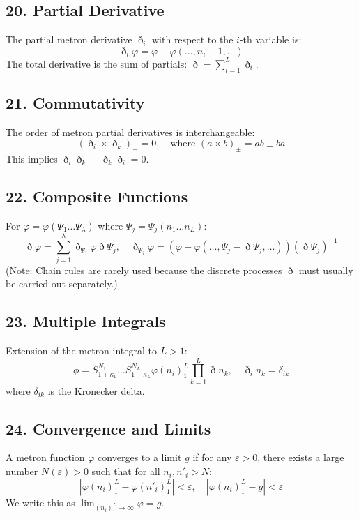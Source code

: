 \documentclass[11pt,a4paper,oneside]{article}
\begin{document}
\subsection{20. Partial Derivative}
The partial metron derivative $\eth_i$ with respect to the $i$-th variable is:
\[
    \eth_i \varphi = \varphi - \varphi(\dots, n_i-1, \dots)
\]
The total derivative is the sum of partials: $\eth = \sum_{i=1}^L \eth_i$.

\subsection{21. Commutativity}
The order of metron partial derivatives is interchangeable:
\begin{equation*}
    (\eth_i \times \eth_k)_- = 0, \quad \text{where } (a \times b)_\pm = ab \pm ba
\end{equation*}
This implies $\eth_i \eth_k - \eth_k \eth_i = 0$.

\subsection{22. Composite Functions}
For $\varphi = \varphi(\Psi_1 \dots \Psi_\lambda)$ where $\Psi_j = \Psi_j(n_1 \dots n_L)$:
\begin{equation}
    \eth \varphi = \sum_{j=1}^{\lambda} \eth_{\Psi_j} \varphi \eth \Psi_j, \quad \eth_{\Psi_j} \varphi = (\varphi - \varphi(\dots, \Psi_j - \eth \Psi_j, \dots))(\eth \Psi_j)^{-1} \tag{M9a}
\end{equation}
(Note: Chain rules are rarely used because the discrete processes $\eth$ must usually be carried out separately.)

\subsection{23. Multiple Integrals}
Extension of the metron integral to $L > 1$:
\begin{equation}
    \phi = S_{1+\kappa_1}^{N_1} \dots S_{1+\kappa_L}^{N_L} \varphi(n_i)_1^L \prod_{k=1}^L \eth n_k, \quad \eth_i n_k = \delta_{ik} \tag{M10}
\end{equation}
where $\delta_{ik}$ is the Kronecker delta.

\subsection{24. Convergence and Limits}
A metron function $\varphi$ converges to a limit $g$ if for any $\varepsilon > 0$, there exists a large number $N(\varepsilon) > 0$ such that for all $n_i, n'_i > N$:
\begin{equation*}
    |\varphi(n_i)_1^L - \varphi(n'_i)_1^L| < \varepsilon, \quad |\varphi(n_i)_1^L - g| < \varepsilon
\end{equation*}
We write this as $\lim_{(n_i)_1^L \to \infty} \varphi = g$.
\end{document}
